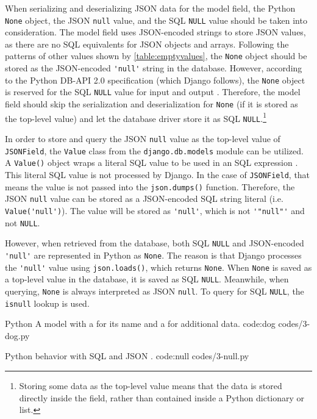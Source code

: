 When serializing and deserializing JSON data for the model field, the Python
\verb|None| object, the JSON \verb|null| value, and the SQL \verb|NULL| value
should be taken into consideration. The model field uses JSON-encoded strings
to store JSON values, as there are no SQL equivalents for JSON objects and
arrays. Following the patterns of other values shown by
\autoref{table:emptyvalues}, the \verb|None| object should be stored as the
JSON-encoded \verb|'null'| string in the database. However, according to the
Python DB-API 2.0 specification (which Django follows), the \verb|None| object
is reserved for the SQL \verb|NULL| value for input and output \cite{db-api2}.
Therefore, the model field should skip the serialization and deserialization
for \verb|None| (if it is stored as the top-level value) and let the database
driver store it as SQL \verb|NULL|.\footnote{Storing some data as the top-level
value means that the data is stored directly inside the field, rather than
contained inside a Python dictionary or list.}

In order to store and query the JSON \verb|null| value as the top-level value
of \verb|JSONField|, the \verb|Value| class from the \verb|django.db.models|
module can be utilized. A \verb|Value()| object wraps a literal SQL value to be
used in an SQL expression \cite{django:value}. This literal SQL value is not
processed by Django. In the case of \verb|JSONField|, that means the value is
not passed into the \verb|json.dumps()| function. Therefore, the JSON
\verb|null| value can be stored as a JSON-encoded SQL string literal (i.e.
\verb|Value('null')|). The value will be stored as \verb|'null'|, which is
not \verb|'"null"'| and not \verb|NULL|.

However, when retrieved from the database, both SQL \verb|NULL| and
JSON-encoded \verb|'null'| are represented in Python as \verb|None|. The reason
is that Django processes the \verb|'null'| value using \verb|json.loads()|,
which returns \verb|None|. When \verb|None| is saved as a top-level value in
the database, it is saved as SQL \verb|NULL|. Meanwhile, when querying,
\verb|None| is always interpreted as JSON \verb|null|. To query for SQL
\verb|NULL|, the \verb|isnull| lookup is used.

\listing
{Python}
{A  model with a  for its name and a 
for additional data.}
{code:dog}
{codes/3-dog.py}

\listing
{Python}
{ behavior with SQL  and JSON .}
{code:null}
{codes/3-null.py}

